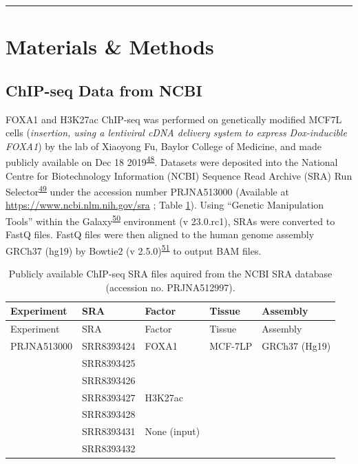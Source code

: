 \documentclass[
  12pt,
]{article}
\begin{document}
\begin{center}\rule{0.5\linewidth}{0.5pt}\end{center}

\hypertarget{materials-methods}{%
\section{Materials \& Methods}\label{materials-methods}}

\hypertarget{chip-seq-data-from-ncbi}{%
\subsection{ChIP-seq Data from NCBI}\label{chip-seq-data-from-ncbi}}

FOXA1 and H3K27ac ChIP-seq was performed on genetically modified MCF7L cells (\emph{insertion, using a lentiviral cDNA delivery system to express Dox-inducible FOXA1}) by the lab of Xiaoyong Fu, Baylor College of Medicine, and made publicly available on Dec 18 2019\textsuperscript{\protect\hyperlink{ref-fu2019}{48}}.
Datasets were deposited into the National Centre for Biotechnology Information (NCBI) Sequence Read Archive (SRA) Run Selector\textsuperscript{\protect\hyperlink{ref-leinonen2010}{49}} under the accession number PRJNA513000 (Available at \url{https://www.ncbi.nlm.nih.gov/sra} ; Table \ref{tab:data}).
Using ``Genetic Manipulation Tools'' within the Galaxy\textsuperscript{\protect\hyperlink{ref-thegala2022}{50}} environment (v 23.0.rc1), SRAs were converted to FastQ files.
FastQ files were then aligned to the human genome assembly GRCh37 (hg19) by Bowtie2 (v 2.5.0)\textsuperscript{\protect\hyperlink{ref-langmead2012}{51}} to output BAM files.

\begin{longtable}[]{@{}lllll@{}}
\caption{\label{tab:data}Publicly available ChIP-seq SRA files aquired from the NCBI SRA database (accession no. PRJNA512997).}\tabularnewline
\toprule()
Experiment & SRA & Factor & Tissue & Assembly \\
\midrule()
\endfirsthead
\toprule()
Experiment & SRA & Factor & Tissue & Assembly \\
\midrule()
\endhead
PRJNA513000 & SRR8393424 & FOXA1 & MCF-7LP & GRCh37 (Hg19) \\
& SRR8393425 & & & \\
& SRR8393426 & & & \\
& SRR8393427 & H3K27ac & & \\
& SRR8393428 & & & \\
& SRR8393431 & None (input) & & \\
& SRR8393432 & & & \\
\bottomrule()
\end{longtable}
\end{document}
